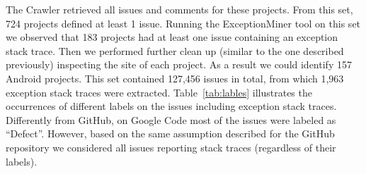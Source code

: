 The Crawler retrieved all issues and comments for these projects.
From this set, 724 projects defined at least 1 issue. Running the ExceptionMiner tool
 on this set we observed that 183 projects had at least one issue containing an exception stack trace.
 Then we performed further clean up (similar to the one described previously) inspecting the site
of each project. As a result we could identify 157 Android projects.  This set contained  127,456 issues in total,
 from which 1,963 exception stack traces were extracted. Table~\ref{tab:lables} illustrates the occurrences of different labels
on the issues including exception stack traces. Differently from GitHub, on Google Code most of
the issues were labeled as ``Defect''. However, based on the same assumption described for the GitHub repository
 we considered all issues reporting stack traces (regardless of their labels).






